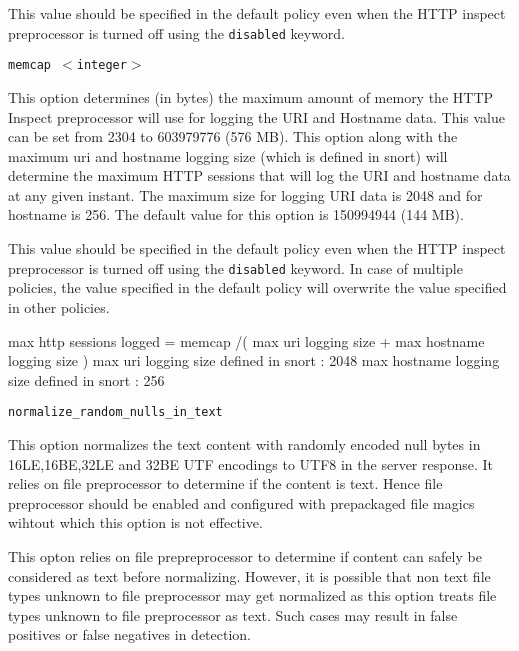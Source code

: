 \documentclass[english]{report}
\newcounter{slistnum}
\newenvironment{slist}
{ \begin{list}{ {\bf \arabic{slistnum}.} }{\usecounter{slistnum} } }
{ \end{list} }
\newenvironment{note}{
\samepage
    \vspace{10pt}{\textsf{
        {\hspace{7pt}\Huge{$\triangle$\hspace{-12.5pt}{\Large{$^!$}}}}\hspace{5pt}
        {\Large{NOTE}}
    }
    }
   \begin{center}
    \par\vspace{-17pt}

    \begin{lrbox}{\savepar}
    \begin{minipage}[r]{6in}
}
{
    \end{minipage}
    \end{lrbox}
    \fbox{
        \usebox{
            \savepar
	}
    }
    \par\vskip10pt
    \end{center}
}
\newenvironment{note}{
        \begin{rawhtml}
        <p><table border="1"><tr><td><b>
        Note:&nbsp;&nbsp;</b>
        \end{rawhtml}
}{
        \begin{rawhtml}
        </b></td></tr></table></p>
        \end{rawhtml}
}
\begin{document}
\begin{slist}
\begin{note}

This value should be specified in the default policy even when the HTTP inspect preprocessor is 
turned off using the \texttt{disabled} keyword.

\end{note}

\item \texttt{memcap $<$integer$>$}

This option determines (in bytes) the maximum amount of memory the HTTP Inspect preprocessor
will use for logging the URI and Hostname data. This value can be set from 2304 to 603979776 (576 MB).
This option along with the maximum uri and hostname logging size (which is defined in snort) will
determine the maximum HTTP sessions that will log the URI and hostname data at any given instant. The
maximum size for logging URI data is 2048 and for hostname is 256. The default value for this
option is 150994944 (144 MB).

\begin {note}

This value should be specified in the default policy even when the HTTP inspect preprocessor is turned off 
using the \texttt{disabled} keyword. In case of multiple policies, the value specified in the
default policy will overwrite the value specified in other policies.

max http sessions logged = memcap /( max uri logging size + max hostname logging size )
max uri logging size defined in snort : 2048
max hostname logging size defined in snort : 256

\end{note}

\item \texttt{normalize\_random\_nulls\_in\_text}

This option normalizes the text content with randomly encoded null bytes in 16LE,16BE,32LE and
32BE UTF encodings to UTF8 in the server response. It relies on file preprocessor to determine
if the content is text. Hence file preprocessor should be enabled and configured with prepackaged
file magics wihtout which this option is not effective.

\begin {note}
This opton relies on file prepreprocessor to determine if content can safely be considered as text
before normalizing. However, it is possible that non text file types unknown to file preprocessor
may get normalized as this option treats file types unknown to file preprocessor as text. Such cases
may result in false positives or false negatives in detection. 


\end{note}
\end{slist}
\end{document}
